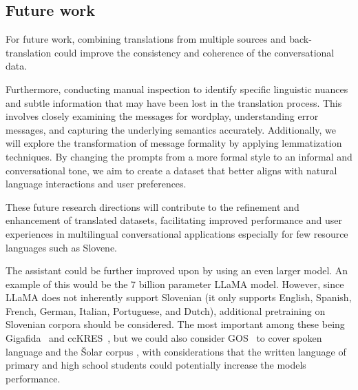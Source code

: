 \documentclass[fleqn,moreauthors,10pt]{ds_report}
\begin{document}

    \subsection*{Future work}
    For future work, combining translations from multiple sources and back-translation could improve the consistency and coherence of the conversational data.
    
    Furthermore, conducting manual inspection to identify specific linguistic nuances and subtle information that may have been lost in the translation process. This involves closely examining the messages for wordplay, understanding error messages, and capturing the underlying semantics accurately. 
    Additionally, we will explore the transformation of message formality by applying lemmatization techniques. By changing the prompts from a more formal style to an informal and conversational tone, we aim to create a dataset that better aligns with natural language interactions and user preferences.
    
    These future research directions will contribute to the refinement and enhancement of translated datasets, facilitating improved performance and user experiences in multilingual conversational applications especially for few resource languages such as Slovene.
    
    The assistant could be further improved upon by using an even larger model. An example of this would be the 7 billion parameter LLaMA model. However, since LLaMA does not inherently support Slovenian (it only supports English, Spanish, French, German, Italian, Portuguese, and Dutch), additional pretraining on Slovenian corpora should be considered. The most important among these being Gigafida~\cite{11356/1320} and ccKRES~\cite{ccKres}, but we could also consider GOS~\cite{Verdonik2013} to cover spoken language and the Šolar corpus \cite{kosem2011slovenian}, with considerations that the written language of primary and high school students could potentially increase the models performance.


\end{document}
